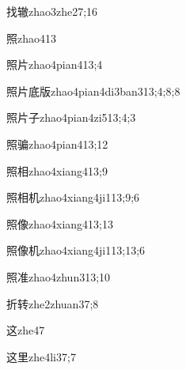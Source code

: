 \begin{verbete}{找辙}{zhao3zhe2}{7;16}
\end{verbete}
\begin{verbete}{照}{zhao4}{13}
\end{verbete}
\begin{verbete}{照片}{zhao4pian4}{13;4}
\end{verbete}
\begin{verbete}{照片底版}{zhao4pian4di3ban3}{13;4;8;8}
\end{verbete}
\begin{verbete}{照片子}{zhao4pian4zi5}{13;4;3}
\end{verbete}
\begin{verbete}{照骗}{zhao4pian4}{13;12}
\end{verbete}
\begin{verbete}{照相}{zhao4xiang4}{13;9}
\end{verbete}
\begin{verbete}{照相机}{zhao4xiang4ji1}{13;9;6}
\end{verbete}
\begin{verbete}{照像}{zhao4xiang4}{13;13}
\end{verbete}
\begin{verbete}{照像机}{zhao4xiang4ji1}{13;13;6}
\end{verbete}
\begin{verbete}{照准}{zhao4zhun3}{13;10}
\end{verbete}
\begin{verbete}{折转}{zhe2zhuan3}{7;8}
\end{verbete}
\begin{verbete}{这}{zhe4}{7}
\end{verbete}
\begin{verbete}{这里}{zhe4li3}{7;7}
\end{verbete}
